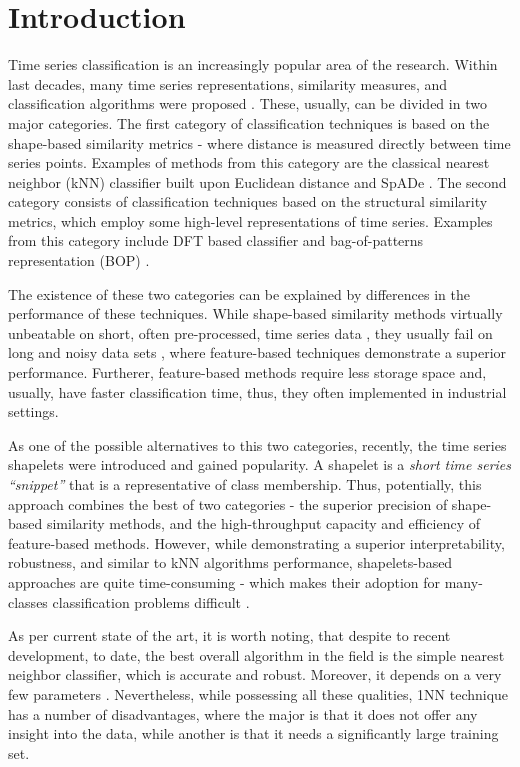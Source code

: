 \documentclass{llncs}
\begin{document}
\section{Introduction}
%
Time series classification is an increasingly popular area of the research. 
Within last decades, many time series representations, similarity measures, 
and classification algorithms were proposed \cite{review}. 
These, usually, can be divided in two major categories. 
The first category of classification techniques is based on the shape-based 
similarity metrics - where distance is measured directly between time series points. 
Examples of methods from this category are the classical nearest neighbor (kNN)
classifier built upon Euclidean distance \cite{1NN} and SpADe \cite{spade}. 
The second category consists of classification techniques based on the 
structural similarity metrics, which employ some high-level representations 
of time series. Examples from this category include DFT based classifier \cite{DFT}
and bag-of-patterns representation (BOP) \cite{bag_patterns}. 

The existence of these two categories can be explained by differences in the 
performance of these techniques. 
While shape-based similarity methods virtually unbeatable on short, 
often pre-processed, time series data \cite{benchmark}, 
they usually fail on long and noisy data sets \cite{indexing},
where feature-based techniques demonstrate a superior performance. 
Furtherer, feature-based methods require less storage space and, usually, 
have faster classification time, thus, they often implemented in industrial settings. 

As one of the possible alternatives to this two categories, recently, the time series shapelets
were introduced \cite{shapelet} and gained popularity. A shapelet is a \textit{short time 
series ``snippet''} that is a representative of class membership. Thus, potentially, this 
approach combines the best of two categories - the superior precision of shape-based 
similarity methods, and the high-throughput capacity and efficiency of feature-based 
methods.
However, while demonstrating a superior interpretability, robustness, 
and similar to kNN algorithms performance, shapelets-based approaches are quite time-consuming 
- which makes their adoption for many-classes classification problems difficult \cite{bagnal}. 

As per current state of the art, it is worth noting, that despite to recent development, to date,
the best overall algorithm in the field is the simple nearest neighbor classifier, which is 
accurate and robust. Moreover, it depends on a very few parameters \cite{benchmark} 
\cite{comparison} \cite{classifiers}. Nevertheless, while possessing all these qualities,
1NN technique has a number of disadvantages, where the major is that it does not offer any 
insight into the data, while another is that it needs a significantly large training set.
\end{document}
